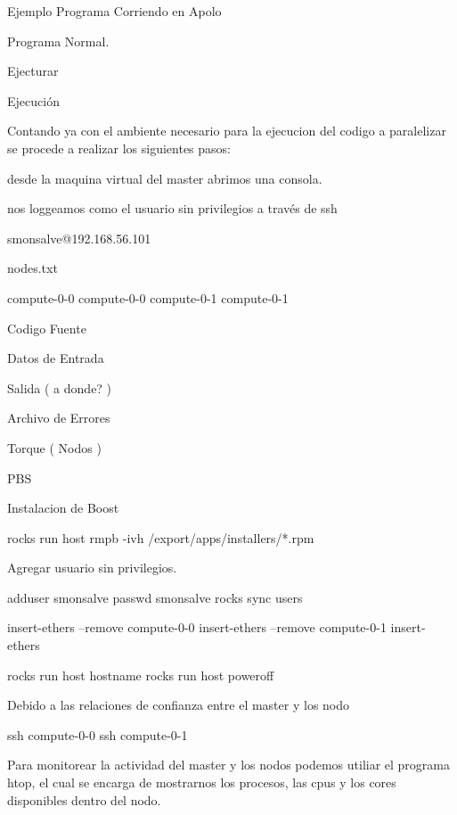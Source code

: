 
Ejemplo Programa Corriendo en Apolo

Programa Normal. 

Ejecturar


Ejecución

Contando ya con el ambiente necesario para la ejecucion del codigo a paralelizar se procede a realizar los siguientes pasos: 


desde la maquina virtual del master abrimos una consola. 

nos loggeamos como el usuario sin privilegios a través de ssh

smonsalve@192.168.56.101




nodes.txt


compute-0-0
compute-0-0
compute-0-1
compute-0-1




Codigo Fuente

Datos de Entrada

Salida ( a donde? )

Archivo de Errores

Torque  ( Nodos  )

PBS




Instalacion de Boost




rocks run host rmpb -ivh /export/apps/installers/*.rpm


Agregar usuario sin privilegios. 

adduser smonsalve
passwd smonsalve
rocks sync users


insert-ethers --remove compute-0-0
insert-ethers --remove compute-0-1
insert-ethers 

rocks run host hostname
rocks run host poweroff



Debido a las relaciones de confianza entre el master y los nodo


ssh compute-0-0
ssh compute-0-1


Para monitorear la actividad del master y los nodos podemos utiliar el programa htop, el cual se encarga de mostrarnos los procesos, las cpus y los cores disponibles dentro del nodo. 
 